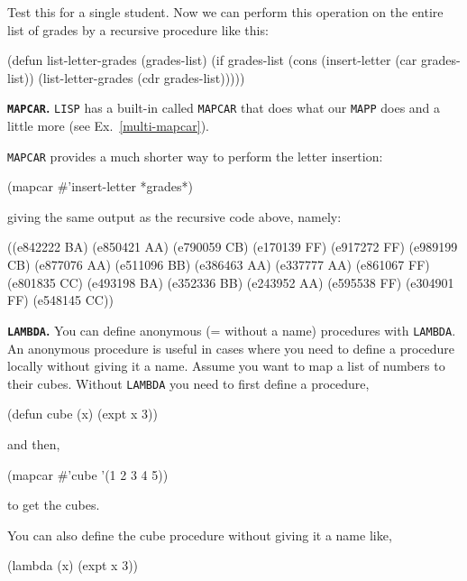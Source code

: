 \documentclass[a4paper,11pt]{article}
\begin{document}
\begin{uenum}
Test this for a single student. Now we can perform this operation on the entire list of grades by a recursive procedure like this:

\begin{lispcode}
(defun list-letter-grades (grades-list)
  (if grades-list
    (cons
      (insert-letter (car grades-list))
      (list-letter-grades (cdr grades-list)))))
\end{lispcode}

\item {\bf \Verb+MAPCAR+.} \Verb+LISP+ has a built-in called \Verb+MAPCAR+ that does what our \Verb+MAPP+ does and a little more (see Ex.\ \ref{multi-mapcar}). 

\Verb+MAPCAR+ provides a much shorter way to perform the letter insertion:

\begin{lispcode}
(mapcar #'insert-letter *grades*)
\end{lispcode}
giving the same output as the recursive code above, namely:

\begin{lispcode}
((e842222 BA) (e850421 AA) (e790059 CB) (e170139 FF)
 (e917272 FF) (e989199 CB) (e877076 AA) (e511096 BB)
 (e386463 AA) (e337777 AA) (e861067 FF) (e801835 CC)
 (e493198 BA) (e352336 BB) (e243952 AA) (e595538 FF)
 (e304901 FF) (e548145 CC))
\end{lispcode}

\item {\bf \Verb+LAMBDA+.} You can define anonymous (= without a name) procedures with \Verb+LAMBDA+. An anonymous procedure is useful in cases where you need to define a procedure locally without giving it a name. Assume you want to map a list of numbers to their cubes. Without \Verb+LAMBDA+ you need to first define a procedure,

\begin{lispcode}
(defun cube (x)
  (expt x 3))
\end{lispcode}

and then,

\begin{lispcode}
(mapcar #'cube '(1 2 3 4 5))
\end{lispcode}

to get the cubes.

You can also define the cube procedure without giving it a name like,

\begin{lispcode}
(lambda (x) (expt x 3))
\end{lispcode}


\end{uenum}
\end{document}
